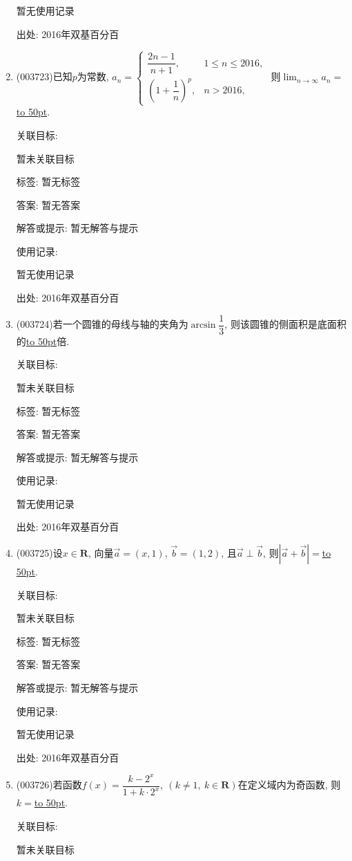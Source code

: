 \documentclass[10pt,a4paper]{article}
\newcommand{\blank}[1]{\underline{\hbox to #1pt{}}}
\begin{document}
\begin{enumerate}[1.]
暂无使用记录


出处: 2016年双基百分百
\item { (003723)}已知$p$为常数, $a_n=\begin{cases}
\dfrac{2n-1}{n+1}, &1\le n\le 2016,\\\left(1+\dfrac 1n\right)^p, & n>2016,
\end{cases}$ 则$\displaystyle\lim_{n\to \infty}a_n=$\blank{50}.


关联目标:

暂未关联目标



标签: 暂无标签

答案: 暂无答案

解答或提示: 暂无解答与提示

使用记录:

暂无使用记录


出处: 2016年双基百分百
\item { (003724)}若一个圆锥的母线与轴的夹角为$\arcsin\dfrac 13$, 则该圆锥的侧面积是底面积的\blank{50}倍.


关联目标:

暂未关联目标



标签: 暂无标签

答案: 暂无答案

解答或提示: 暂无解答与提示

使用记录:

暂无使用记录


出处: 2016年双基百分百
\item { (003725)}设$x\in\mathbf{R}$, 向量$\overrightarrow{a}=(x,1)$, $\overrightarrow{b}=(1,2)$, 且$\overrightarrow{a}\perp \overrightarrow{b}$, 则$|\overrightarrow{a}+\overrightarrow{b}|=$\blank{50}.


关联目标:

暂未关联目标



标签: 暂无标签

答案: 暂无答案

解答或提示: 暂无解答与提示

使用记录:

暂无使用记录


出处: 2016年双基百分百
\item { (003726)}若函数$f(x)=\dfrac{k-2^x}{1+k\cdot 2^x}, \ (k\ne 1, \ k\in \mathbf{R})$在定义域内为奇函数, 则$k=$\blank{50}.


关联目标:

暂未关联目标




\end{enumerate}
\end{document}
